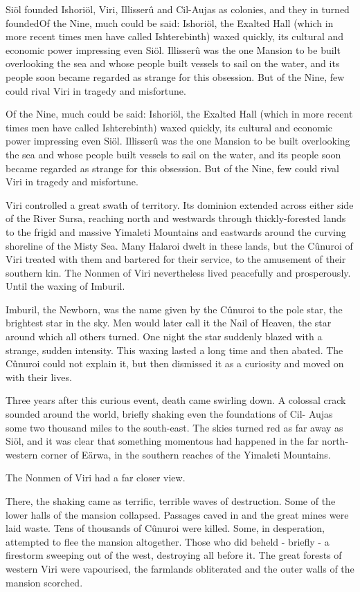 \documentclass[]{book}
\begin{document}
Siöl founded Ishoriöl, Viri, Illisserû and Cil-Aujas as colonies, and they in turned
foundedOf the Nine, much could be said: Ishoriöl, the Exalted Hall (which in more recent
times men have called Ishterebinth) waxed quickly, its cultural and economic power
impressing even Siöl. Illisserû was the one Mansion to be built overlooking the sea and
whose people built vessels to sail on the water, and its people soon became regarded as
strange for this obsession. But of the Nine, few could rival Viri in tragedy and
misfortune.

Of the Nine, much could be said: Ishoriöl, the Exalted Hall (which in more recent
times men have called Ishterebinth) waxed quickly, its cultural and economic power
impressing even Siöl. Illisserû was the one Mansion to be built overlooking the sea and
whose people built vessels to sail on the water, and its people soon became regarded as
strange for this obsession. But of the Nine, few could rival Viri in tragedy and
misfortune.

Viri controlled a great swath of territory. Its dominion extended across either side of
the River Sursa, reaching north and westwards through thickly-forested lands to the
frigid and massive Yimaleti Mountains and eastwards around the curving shoreline of
the Misty Sea. Many Halaroi dwelt in these lands, but the Cûnuroi of Viri treated with
them and bartered for their service, to the amusement of their southern kin. The
Nonmen of Viri nevertheless lived peacefully and prosperously. Until the waxing of
Imburil.

Imburil, the Newborn, was the name given by the Cûnuroi to the pole star, the
brightest star in the sky. Men would later call it the Nail of Heaven, the star around
which all others turned. One night the star suddenly blazed with a strange, sudden
intensity. This waxing lasted a long time and then abated. The Cûnuroi could not
explain it, but then dismissed it as a curiosity and moved on with their lives.

Three years after this curious event, death came swirling down.
A colossal crack sounded around the world, briefly shaking even the foundations of Cil-
Aujas some two thousand miles to the south-east. The skies turned red as far away as
Siöl, and it was clear that something momentous had happened in the far north-
western corner of Eärwa, in the southern reaches of the Yimaleti Mountains.

The Nonmen of Viri had a far closer view.

There, the shaking came as terrific, terrible waves of destruction. Some of the lower
halls of the mansion collapsed. Passages caved in and the great mines were laid waste.
Tens of thousands of Cûnuroi were killed. Some, in desperation, attempted to flee the
mansion altogether. Those who did beheld - briefly - a firestorm sweeping out of the
west, destroying all before it. The great forests of western Viri were vapourised, the
farmlands obliterated and the outer walls of the mansion scorched.
\end{document}
